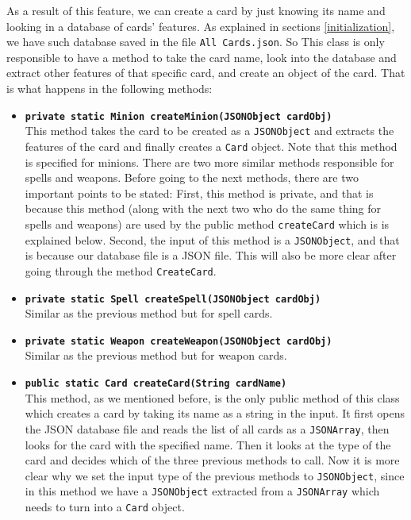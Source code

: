 \documentclass[a4paper]{article}
\begin{document}
As a result of this feature, we can create a card by just knowing its name and looking in a database of cards' features. As explained in sections \ref{initialization}, we have such database saved in the file \texttt{All Cards.json}. So This class is only responsible to have a method to take the card name, look into the database and extract other features of that specific card, and create an object of the card. That is what happens in the following methods:
\begin{itemize}
	\item \texttt{\textbf{private static Minion createMinion(JSONObject cardObj)}}\\
	
	This method takes the card to be created as a \texttt{JSONObject} and extracts the features of the card and finally creates a \texttt{Card} object. Note that this method is specified for minions. There are two more similar methods responsible for spells and weapons. Before going to the next methods, there are two important points to be stated: First, this method is private, and that is because this method (along with the next two who do the same thing for spells and weapons) are used by the public method \texttt{createCard} which is is explained below. Second, the input of this method is a \texttt{JSONObject}, and that is because our database file is a JSON file. This will also be more clear after going through the method \texttt{CreateCard}.
	
	\item \texttt{\textbf{private static Spell createSpell(JSONObject cardObj)}}\\
	Similar as the previous method but for spell cards.
	
	\item \texttt{\textbf{private static Weapon createWeapon(JSONObject cardObj)}}\\
	Similar as the previous method but for weapon cards.	
	
	\item \texttt{\textbf{public static Card createCard(String cardName)}}\\
	This method, as we mentioned before, is the only public method of this class which creates a card by taking its name as a string in the input. It first opens the JSON database file and reads the list of all cards as a \texttt{JSONArray}, then looks for the card with the specified name. Then it looks at the type of the card and decides which of the three previous methods to call. Now it is more clear why we set the input type of the previous methods to \texttt{JSONObject}, since in this method we have a \texttt{JSONObject} extracted from a \texttt{JSONArray} which needs to turn into a \texttt{Card} object.
	
\end{itemize}
\end{document}
